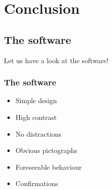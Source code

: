 \documentclass[9pt]{beamer}
\begin{document}
%		    	
%		    	
%		    	
%				
		    	
	
	\section{Conclusion}
	
	
		\subsection{The software}
			\begin{frame}
				\begin{center}
					Let us have a look at the software!
				\end{center}
			\end{frame}
		
			\begin{frame}
				\frametitle{The software}
				\begin{itemize}
					\item Simple design
					\item High contrast
					\item No distractions
					\item Obvious pictographs
					\item Foreseeable behaviour
					\item Confirmations
				\end{itemize}
			
			\end{frame}
		
\end{document}
